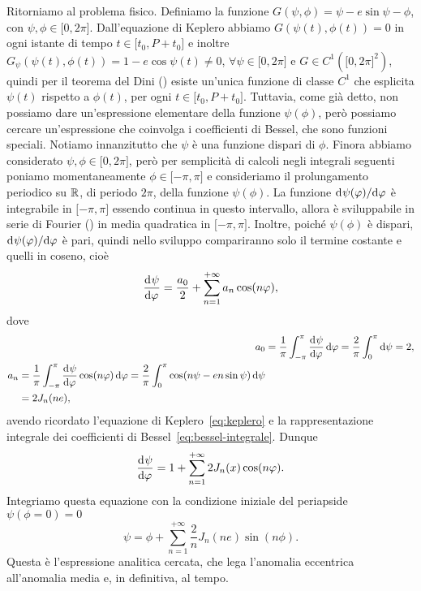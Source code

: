 Ritorniamo al problema fisico. Definiamo la funzione $G(\psi,\phi) = \psi -
e\sin\psi - \phi$, con $\psi,\phi\in\mathopen{[}0,
2\pi\mathclose{]}$. Dall'equazione di Keplero abbiamo $G(\psi(t),\phi(t)) = 0$
in ogni istante di tempo $t\in\mathopen{[}t_0,P+t_0\mathclose{]}$ e inoltre
$G_\psi(\psi(t),\phi(t)) = 1 - e\cos\psi(t) \neq 0$,
$\forall\psi\in\mathopen{[}0, 2\pi\mathclose{]}$ e $G\in C^1(\mathopen{[}0,
2\pi\mathclose{]}^2)$, quindi per il teorema del Dini
(\textcite[267]{demarco:analisi2}) esiste un'unica funzione di classe $C^1$ che
esplicita $\psi(t)$ rispetto a $\phi(t)$, per ogni
$t\in\mathopen{[}t_0,P+t_0\mathclose{]}$. Tuttavia, come già detto, non possiamo
dare un'espressione elementare della funzione $\psi(\phi)$, però possiamo
cercare un'espressione che coinvolga i coefficienti di Bessel, che sono funzioni
speciali. Notiamo innanzitutto che $\psi$ è una funzione dispari di
$\phi$. Finora abbiamo considerato $\psi,\phi\in\mathopen{[}0,
2\pi\mathclose{]}$, però per semplicità di calcoli negli integrali seguenti
poniamo momentaneamente $\phi\in\mathopen{[}-\pi, \pi\mathclose{]}$ e
consideriamo il prolungamento periodico su $\mathbb{R}$, di periodo $2\pi$, della
funzione $\psi(\phi)$. La funzione $\mathrm{d}^{}\psi(\varphi) / \mathrm{d} {\varphi}^{}$ è integrabile
in $\mathopen{[}-\pi, \pi\mathclose{]}$ essendo continua in questo intervallo,
allora è sviluppabile in serie di Fourier (\textcite[440]{demarco:analisi2}) in
media quadratica in $\mathopen{[}-\pi, \pi\mathclose{]}$. Inoltre, poiché
$\psi(\phi)$ è dispari, $\mathrm{d}^{}\psi(\varphi) / \mathrm{d} {\varphi}^{}$ è pari, quindi nello
sviluppo compariranno solo il termine costante e quelli in coseno, cioè
\begin{equation}
  \frac{{\mathop{}\!\mathrm{d}^{}}\psi}{\mathop{}\!\mathrm{d} {\varphi}^{}} = \frac{a_0}{2} + \sum_{n=1}^{+\infty}a_n\cos(n\varphi),
\end{equation}
dove
\begin{align}
  a_0 &= \frac{1}{\pi}\int_{-\pi}^{\pi}\toder{\psi}{\phi}\dd\phi =
  \frac{2}{\pi}\int_0^\pi\dd\psi = 2,\\
  \begin{split}
    a_n &= \frac{1}{\pi}\int_{-\pi}^\pi\toder{\psi}{\phi}\cos(n\phi)\dd\phi =
    \frac{2}{\pi}\int_0^\pi\cos(n\psi - en\sin\psi)\dd\psi \\
    &= 2J_n(ne),
  \end{split}
\end{align}
avendo ricordato l'equazione di Keplero~\eqref{eq:keplero} e la rappresentazione
integrale dei coefficienti di Bessel~\eqref{eq:bessel-integrale}. Dunque
\begin{equation}
  \frac{{\mathop{}\!\mathrm{d}^{}}\psi}{\mathop{}\!\mathrm{d} {\varphi}^{}} = 1 + \sum_{n=1}^{+\infty}2J_n(x)\cos(n\varphi).
\end{equation}
Integriamo questa equazione con la condizione iniziale del periapside $\psi(\phi
= 0) = 0$
\begin{equation}
  \psi = \phi + \sum_{n=1}^{+\infty}\frac{2}{n}J_n(ne)\sin(n\phi).
\end{equation}
Questa è l'espressione analitica cercata, che lega l'anomalia eccentrica
all'anomalia media e, in definitiva, al tempo.

